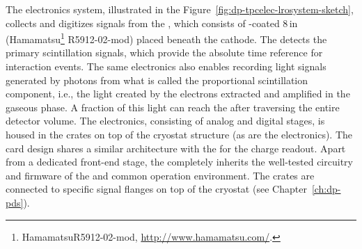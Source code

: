 The  electronics system, illustrated in the Figure~\ref{fig:dp-tpcelec-lrosystem-sketch},  collects and digitizes signals from the , which consists of -coated \num{8}\,in  (Hamamatsu\footnote{Hamamatsu\texttrademark R5912-02-mod, \url{http://www.hamamatsu.com/}.} R5912-02-mod) placed beneath the  cathode. The  detects the primary scintillation signals, which provide the absolute time reference for interaction events. The same electronics also enables recording light signals generated by photons from what is called the proportional scintillation component, i.e., the light created by the electrons extracted and amplified in the gaseous phase. A fraction of this light can reach the  after traversing the entire detector volume. The  electronics, consisting of analog and digital stages, is housed in the  crates on top of the cryostat structure (as are the  electronics). The   card design shares a similar architecture with the  for the charge readout. Apart from a dedicated front-end stage, the   completely inherits the well-tested circuitry and firmware of the   and common operation environment. The   crates are connected to specific  signal \fdth flanges on top of the cryostat (see Chapter~\ref{ch:dp-pds}).

